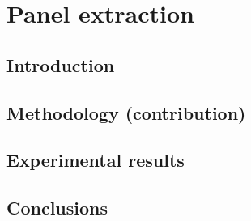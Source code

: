 \chapter{Panel extraction}
\label{chap:intro}
\graphicspath{{./chapters/4-pe/figs/}}

\section{Introduction}
\label{sec:pe:introduction}

\section{Methodology (contribution)}
\label{sec:pe:methodology}

\section{Experimental results}
\label{sec:pe:experimental_results}


\section{Conclusions}
\label{sec:pe:conclusion}

